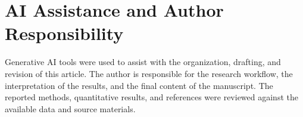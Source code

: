 \section*{AI Assistance and Author Responsibility}
\label{sec:author-ai}

Generative AI tools were used to assist with the
organization, drafting, and revision of this article.
The author is responsible for the research workflow,
the interpretation of the results, and the final
content of the manuscript. The reported methods,
quantitative results, and references were reviewed
against the available data and source materials.
